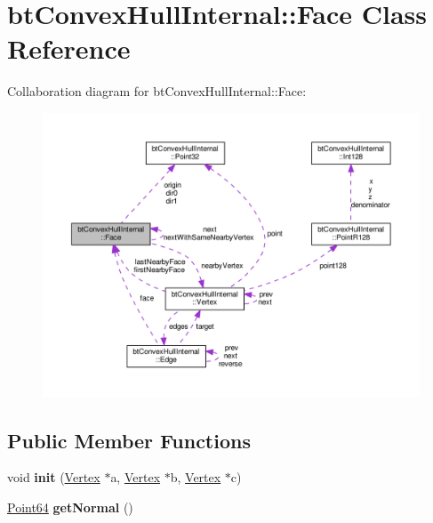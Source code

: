 \hypertarget{classbtConvexHullInternal_1_1Face}{}\section{bt\+Convex\+Hull\+Internal\+:\+:Face Class Reference}
\label{classbtConvexHullInternal_1_1Face}


Collaboration diagram for bt\+Convex\+Hull\+Internal\+:\+:Face\+:
\nopagebreak
\begin{figure}[H]
\begin{center}
\leavevmode
\includegraphics[width=350pt]{classbtConvexHullInternal_1_1Face__coll__graph}
\end{center}
\end{figure}
\subsection*{Public Member Functions}
\begin{DoxyCompactItemize}
\item 
\mbox{\label{classbtConvexHullInternal_1_1Face_a96e1e2caa88fc7438dd7270f188bfafd}} 
void {\bfseries init} (\hyperlink{classbtConvexHullInternal_1_1Vertex}{Vertex} $\ast$a, \hyperlink{classbtConvexHullInternal_1_1Vertex}{Vertex} $\ast$b, \hyperlink{classbtConvexHullInternal_1_1Vertex}{Vertex} $\ast$c)
\item 
\mbox{\label{classbtConvexHullInternal_1_1Face_a641f6cbe6273a95b92f8beb8a8110935}} 
\hyperlink{classbtConvexHullInternal_1_1Point64}{Point64} {\bfseries get\+Normal} ()
\end{DoxyCompactItemize}
